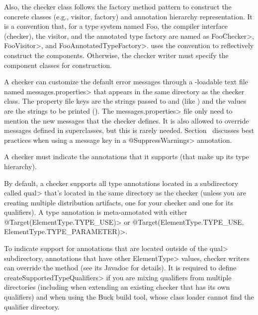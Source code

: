 Also, the checker class follows the factory method pattern to
construct the concrete classes (e.g., visitor, factory) and annotation
hierarchy representation.  It is a convention that, for
a type system named Foo, the compiler
interface (checker), the visitor, and the annotated type factory are
named as \<FooChecker>, \<FooVisitor>, and \<FooAnnotatedTypeFactory>.
 uses the convention to
reflectively construct the components.  Otherwise, the checker writer
must specify the component classes for construction.

\begin{sloppypar}
A checker can customize the default error messages through a
-loadable text file named
\<messages.properties> that appears in the same directory as the checker class.
The property file keys are the strings passed to 
and
(like ) and the values are the strings to be
printed ().
The \<messages.properties> file only need to mention the new messages that
the checker defines.
It is also allowed to override messages defined in superclasses, but this
is rarely needed.
Section~ discusses best practices
when using a message key in a \<@SuppressWarnings> annotation.
\end{sloppypar}


A checker must indicate the annotations that it supports (that make up its type
hierarchy).

By default, a checker supports all type annotations located in a
subdirectory called \<qual> that's located in the same directory as the
checker (unless you are creating multiple distribution artifacts, one for your
checker and one for its qualifiers).
A type annotation is meta-annotated with either
\<@Target(ElementType.TYPE\_USE)>
or
\<@Target({ElementType.TYPE\_USE, ElementType.TYPE\_PARAMETER})>.

To indicate support for annotations that are located outside of the \<qual>
subdirectory, annotations that have other \<ElementType> values,
checker writers can override the
method (see its Javadoc for details).
It is required to define \<createSupportedTypeQualifiers> if you are mixing
qualifiers from multiple directories (including when extending an existing
checker that has its own qualifiers) and when using the Buck build tool,
whose class loader cannot find the qualifier directory.

